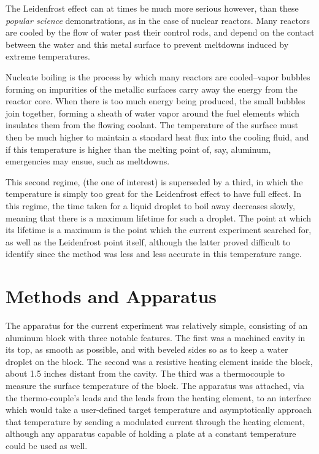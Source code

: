 \documentclass[aps,pre,twocolumn,nofootinbib]{revtex4}
\begin{document}
The Leidenfrost effect can at times be much more serious however, than these \textit{popular science} demonstrations, as in the case of nuclear reactors.  Many reactors are cooled by the flow of water past their control rods, and depend on the contact between the water and this metal surface to prevent meltdowns induced by extreme temperatures.  

Nucleate boiling is the process by which many reactors are cooled--vapor bubbles forming on impurities of the metallic surfaces carry away the energy from the reactor core.  When there is too much energy being produced, the small bubbles join together, forming a sheath of water vapor around the fuel elements which insulates them from the flowing coolant.  The temperature of the surface must then be much higher to maintain a standard heat flux into the cooling fluid, and if this temperature is higher than the melting point of, say, aluminum, emergencies may ensue, such as meltdowns.  

This second regime, (the one of interest) is superseded by a third, in which the temperature is simply too great for the Leidenfrost effect to have full effect.  In this regime, the time taken for a liquid droplet to boil away decreases slowly, meaning that there is a maximum lifetime for such a droplet.  The point at which its lifetime is a maximum is the point which the current experiment searched for, as well as the Leidenfrost point itself, although the latter proved difficult to identify since the method was less and less accurate in this temperature range.  

\section{Methods and Apparatus}

The apparatus for the current experiment was relatively simple, consisting of an aluminum block with three notable features.  The first was a machined cavity in its top, as smooth as possible, and with beveled sides so as to keep a water droplet on the block.  The second was a resistive heating element inside the block, about 1.5 inches distant from the cavity.  The third was a thermocouple to measure the surface temperature of the block.  The apparatus was attached, via the thermo-couple's leads and the leads from the heating element, to an interface which would take a user-defined target temperature and asymptotically approach that temperature by sending a modulated current through the heating element, although any apparatus capable of holding a plate at a constant temperature could be used as well.  
\end{document}
